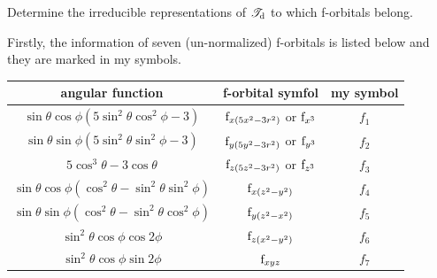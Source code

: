 \documentclass[a4paper]{book}
\newcommand{\orb}[1]{{\rm #1}}
\newcommand{\orbf}{\orb{f}}
\begin{document}
	\setcounter{chapter}{11}

	\begin{exercise}
		Determine the irreducible representations of $\mathscr{T}_{\rm d}$ to which f-orbitals belong.
	\end{exercise}

	\begin{solution}

		Firstly, the information of seven (un-normalized) f-orbitals is listed below and they are marked in my symbols.
		\begin{center}
		\begin{tabular}{ccc}\hline
		angular function &	f-orbital symfol & 	my symbol \\ \hline
	$\sin\theta\cos\phi(5\sin^2\theta\cos^2\phi-3)$ &	$\orbf_{x(5x^2-3r^2)}$ or $\orbf_{x^3}$ & $f_1$ \\
	$\sin\theta\sin\phi(5\sin^2\theta\sin^2\phi-3)$ &	$\orbf_{y(5y^2-3r^2)}$ or $\orbf_{y^3}$ & $f_2$ \\
	$5\cos^3\theta - 3\cos\theta$ &	$\orbf_{z(5z^2-3r^2)}$ or $\orbf_{z^3}$ & $f_3$ \\
	$\sin\theta\cos\phi(\cos^2\theta-\sin^2\theta\sin^2\phi)$ &	$\orbf_{x(z^2-y^2)}$ & $f_4$ \\
	$\sin\theta\sin\phi(\cos^2\theta-\sin^2\theta\cos^2\phi)$ &	$\orbf_{y(z^2-x^2)}$ & $f_5$ \\
	$\sin^2\theta\cos\phi\cos2\phi$ & $\orbf_{z(x^2-y^2)}$ & $f_6$ \\
	$\sin^2\theta\cos\phi\sin2\phi$ & $\orbf_{xyz}$ & $f_7$ \\\hline
		\end{tabular}
		\end{center}
		

\end{solution}
\end{document}
